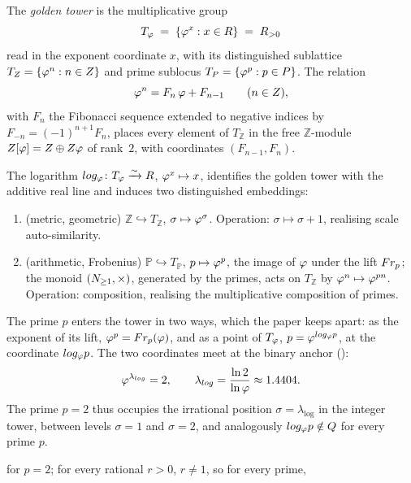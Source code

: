 \begin{definition}\label{def:golden-tower}
The \emph{golden tower} is the multiplicative group
\[
  T_\varphi \;=\; \{\varphi^x : x\in R\} \;=\; R_{>0}
\]
read in the exponent coordinate $x$,
with its distinguished sublattice
$T_Z = \{\varphi^n : n\in Z\}$ and prime sublocus
$T_P = \{\varphi^p : p\in P\}$.
The relation
\begin{equation}\label{eq:tower-extended}
  \varphi^n = F_n\,\varphi + F_{n-1}\qquad (n\in Z),
\end{equation}
with $F_n$ the Fibonacci sequence extended to negative indices by
$F_{-n} = (-1)^{n+1} F_n$, places every element of $T_\mathbb{Z}$ in the free
$\mathbb{Z}$-module $Z[\varphi]=Z\oplus Z\varphi$ of rank~$2$, with coordinates
$(F_{n-1},F_n)$.
\end{definition}

\begin{proposition}\label{prop:two-coords}
The logarithm $log_\varphi\colon T_\varphi\xrightarrow{\sim}R$,
$\varphi^x\mapsto x$, identifies the golden tower with the additive
real line and induces two distinguished embeddings:
\begin{enumerate}[label=\textup{(\alph*)}]
\item \textup{(metric, geometric)} $\mathbb{Z}\hookrightarrow T_\mathbb{Z}$,
  $\sigma\mapsto\varphi^\sigma$.  Operation: $\sigma\mapsto\sigma+1$,
  realising scale auto-similarity.
\item \textup{(arithmetic, Frobenius)} $\mathbb{P}\hookrightarrow T_\mathbb{P}$, $p\mapsto\varphi^p$,
  the image of $\varphi$ under the lift $Fr_p$; the monoid $(N_{\ge1},\times)$, generated by the
  primes, acts on $T_\mathbb{Z}$ by $\varphi^n\mapsto\varphi^{pn}$.
  Operation: composition, realising the multiplicative composition of primes.
\end{enumerate}
The prime $p$ enters the tower in two ways, which the paper keeps apart: as the exponent of its lift,
$\varphi^p=Fr_p(\varphi)$, and as a point of $T_\varphi$, $p=\varphi^{log_\varphi p}$, at the coordinate
$log_\varphi p$.
The two coordinates meet at the binary anchor
\textup{()}:
\begin{equation}\label{eq:mersenne-loc}
  \varphi^{\lambda_{log}} = 2,\qquad
  \lambda_{log} = \frac{\ln 2}{\ln\varphi} \approx 1.4404.
\end{equation}
The prime $p=2$ thus occupies the irrational position
$\sigma = \lambda_{\log}$ in the integer tower, between
levels $\sigma=1$ and $\sigma=2$, and analogously
$log_\varphi p\notin Q$ for every prime $p$.
\end{proposition}
for
$p=2$; for every rational $r>0$, $r\ne1$, so for
every prime,

